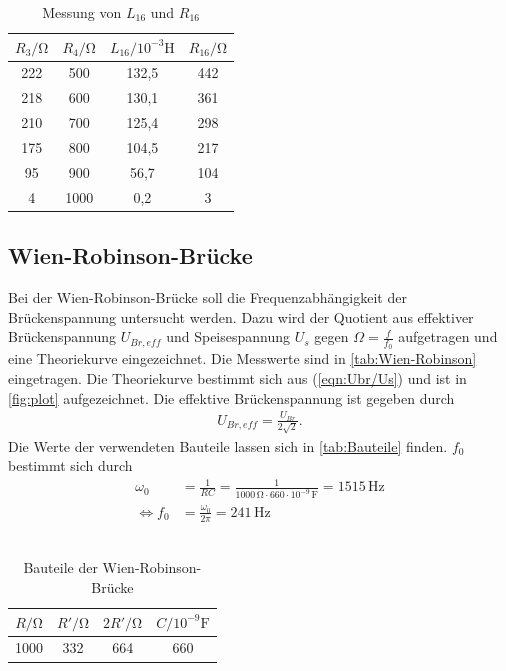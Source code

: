 \documentclass[
  bibliography=totoc,     %
  captions=tableheading,  %
  titlepage=firstiscover, %
]{scrartcl}
\begin{document}
  \begin{table}
    \centering
    \caption{Messung von $L_{16}$ und $R_{16}$}
    \label{tab:Cx,Rx,Maxwell}
    \begin{tabular}{c c c c}
      \toprule
      $R_3/\unit{\ohm}$ & $R_4/\unit{\ohm}$ & $L_{16}/10^{-3}\unit{\henry}$ & $R_{16}/\unit{\ohm}$ \\
      \midrule
      222 &  500 &  132,5 & 442 \\
      218 &  600 &  130,1 & 361 \\
      210 &  700 &  125,4 & 298 \\
      175 &  800 &  104,5 & 217 \\
      95 &  900 &   56,7 & 104 \\
        4 & 1000 &    0,2 &   3 \\
      \bottomrule
    \end{tabular}
  \end{table}
  \FloatBarrier

  \subsection{Wien-Robinson-Brücke}
  Bei der Wien-Robinson-Brücke soll die Frequenzabhängigkeit der Brückenspannung untersucht werden. Dazu wird der Quotient aus effektiver Brückenspannung $U_{Br,eff}$ und Speisespannung $U_s$
  gegen $\Omega = \frac{f}{f_0}$ aufgetragen und eine Theoriekurve eingezeichnet. Die Messwerte sind in \autoref{tab:Wien-Robinson} eingetragen.
  Die Theoriekurve bestimmt sich aus (\autoref{eqn:Ubr/Us}) und ist in \autoref{fig:plot} aufgezeichnet. Die effektive Brückenspannung ist gegeben durch
  \begin{align*}
    U_{Br,eff} = \frac{U_{Br}}{2\sqrt{2}}.
  \end{align*}
  Die Werte der verwendeten Bauteile lassen sich in \autoref{tab:Bauteile} finden. $f_0$ bestimmt sich durch
  \begin{align*}
    \omega_0 &= \frac{1}{RC} = \frac{1}{1000\,\unit{\ohm}\cdot 660 \cdot 10^{-9} \,\unit{\farad}} = 1515\,\unit{\hertz} \\
    \iff f_0 &= \frac{\omega_0}{2\pi} = 241\,\unit{\hertz}
  \end{align*}
  \\
  \begin{table}
    \centering
    \caption{Bauteile der Wien-Robinson-Brücke}
    \label{tab:Bauteile}
    \begin{tabular}{c c c c}
      \toprule
      $R/\unit{\ohm}$ & $R'/\unit{\ohm}$ & $2R'/\unit{\ohm}$ & $C/10^{-9}\unit{\farad}$ \\
      \midrule
      1000 & 332 & 664 & 660 \\
      \bottomrule
    \end{tabular}
  \end{table}
\end{document}
